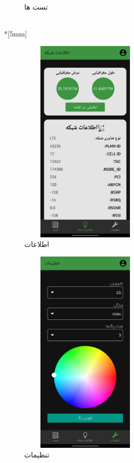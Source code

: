 \documentclass{report}
\begin{document}
\begin{figure}[ht]
\begin{subfigure}[b]{0.3\textwidth}
		\caption{تست ها}
		\label{fig:test}
	\end{subfigure}\\*[5mm]
	\begin{subfigure}[b]{0.3\textwidth}\centering
		\includegraphics[width=0.7\textwidth,height=10cm,keepaspectratio]{Pic/info}
		\caption{اطلاعات}
		\label{fig:info}
	\end{subfigure}
	\begin{subfigure}[b]{0.3\textwidth}\centering
		\includegraphics[width=0.7\textwidth,height=10cm,keepaspectratio]{Pic/setting}
		\caption{تنظیمات}
		\label{fig:setting}
	\end{subfigure}
	\begin{subfigure}[b]{0.3\textwidth}\centering

\end{subfigure}
\end{figure}
\end{document}
